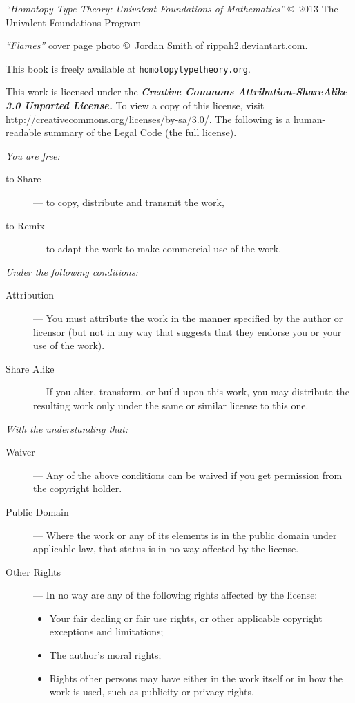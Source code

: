 {\footnotesize
\noindent
\emph{``Homotopy Type Theory: Univalent Foundations of Mathematics''}
\copyright\ 2013 The Univalent Foundations Program

\bigskip

\noindent
\emph{``Flames''} cover page photo
\copyright\ Jordan Smith of \href{http://rippah2.deviantart.com/}{rippah2.deviantart.com}.

\bigskip

\noindent
This book is freely available at
{\tt homotopytypetheory.org}.
%

\bigskip

\noindent
This work is licensed under the
\textbf{\emph{Creative Commons Attribution-ShareAlike 3.0 Unported License.}}
%
To view a copy of this license, visit
\href{http://creativecommons.org/licenses/by-sa/3.0/}{http://creativecommons.org/licenses/by-sa/3.0/}.
The following is a human-readable summary of the Legal Code (the full license).

\bigskip

\noindent
\emph{You are free:}
%
\begin{description}
\item[to Share] --- to copy, distribute and transmit the work,
\item[to Remix] --- to adapt the work to make commercial use of the work.
\end{description}
%
\emph{Under the following conditions:}
%
\begin{description}

\item[Attribution] --- You must attribute the work in the manner specified by the author
  or licensor (but not in any way that suggests that they endorse you or your use of the
  work).

\item[Share Alike] --- If you alter, transform, or build upon this work, you may
  distribute the resulting work only under the same or similar license to this one.
\end{description}
%
\emph{With the understanding that:}
\begin{description}

\item[Waiver] --- Any of the above conditions can be waived if you get permission from the
  copyright holder.

\item[Public Domain] --- Where the work or any of its elements is in the public domain
  under applicable law, that status is in no way affected by the license.

\item[Other Rights] --- In no way are any of the following rights affected by the license:
  \begin{itemize}
  \item Your fair dealing or fair use rights, or other applicable copyright exceptions and
    limitations;
  \item The author's moral rights;
  \item Rights other persons may have either in the work itself or in how the work is
    used, such as publicity or privacy rights.
  \end{itemize}
\end{description}
}
\cleartooddpage


